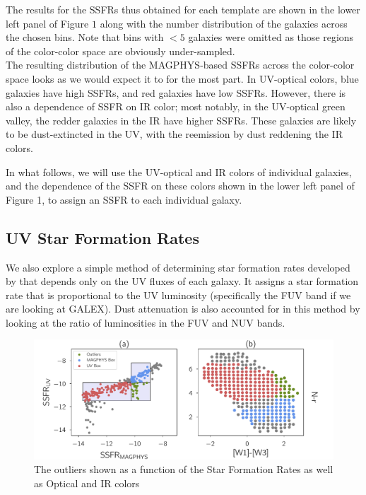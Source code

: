 \documentclass[iop]{emulateapj}
\begin{document}
The results for the SSFRs thus obtained for each template are shown 
in the lower left panel of Figure $1$ along with the number 
distribution of the galaxies across the chosen bins. Note that 
bins with $< 5$ galaxies 
were omitted as those regions of the color-color space are 
obviously under-sampled. \\

The resulting distribution of the MAGPHYS-based SSFRs across the 
color-color space looks as we would expect it to for the most part.
In UV-optical colors, blue galaxies have high SSFRs, and 
red galaxies have low SSFRs. 
However, there is also a dependence of SSFR on IR color; most notably,
in the UV-optical green valley, the redder galaxies in the IR have
higher SSFRs. These galaxies are likely to be dust-extincted in the 
UV, with the reemission by dust reddening the IR colors.

In what follows, we will use the UV-optical and IR colors of individual
galaxies, and the dependence of the SSFR on these colors shown in 
the lower left panel of Figure 1, to assign an SSFR to each individual
galaxy.

\subsection{UV Star Formation Rates}

We also explore a simple method of determining star formation rates
developed by  \citet{salim_uv_2007} that depends only on the UV fluxes of 
each galaxy. It assigns a star formation rate that is proportional 
to the UV luminosity (specifically the FUV band if we are looking at 
GALEX). Dust attenuation is also accounted for in this method by 
looking at the ratio of luminosities in the FUV and NUV bands.\\

\begin{figure}
	\centering
		\includegraphics[width = 16 cm, height = 6.4 cm]{3_outliers.pdf}
	\caption{The outliers shown as a function of the Star Formation Rates as well as Optical and IR colors} 
\end{figure}
\end{document}
